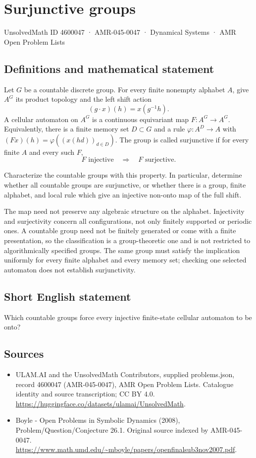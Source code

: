 \documentclass[11pt,a4paper]{article}
\begin{document}
\section*{Surjunctive groups}\label{4600047}
{\small UnsolvedMath ID 4600047 · AMR-045-0047 · Dynamical Systems · AMR Open Problem Lists}
\subsection{Definitions and mathematical statement}
Let $G$ be a countable discrete group. For every finite nonempty
alphabet $A$, give $A^G$ its product topology and the left
shift action
\[
                   (g\cdot x)(h)=x(g^{-1}h).
\]
A cellular automaton on $A^G$ is a continuous equivariant map
$F:A^G\to A^G$. Equivalently, there is a finite memory set
$D\subset G$ and a rule $\varphi:A^D\to A$ with
$(Fx)(h)=\varphi((x(hd))_{d\in D})$.
The group is called surjunctive if for every finite $A$ and
every such $F$,
\[
                       F\text{ injective}\quad\Longrightarrow\quad
                       F\text{ surjective}.
\]

Characterize the countable groups with this property. In
particular, determine whether all countable groups are
surjunctive, or whether there is a group, finite alphabet, and
local rule which give an injective non-onto map of the full
shift.

The map need not preserve any algebraic structure on the
alphabet. Injectivity and surjectivity concern all configurations,
not only finitely supported or periodic ones. A countable group
need not be finitely generated or come with a finite presentation,
so the classification is a group-theoretic one and is not
restricted to algorithmically specified groups. The same group
must satisfy the implication uniformly for every finite alphabet
and every memory set; checking one selected automaton does
not establish surjunctivity.
\subsection{Short English statement}
Which countable groups force every injective finite-state cellular automaton to be onto?
\subsection{Sources}
\begin{itemize}
\item[S1] ULAM.AI and the UnsolvedMath Contributors, supplied problems.json, record 4600047 (AMR-045-0047), AMR Open Problem Lists. Catalogue identity and source transcription; CC BY 4.0.
\url{https://huggingface.co/datasets/ulamai/UnsolvedMath}.
\item[S2] Boyle - Open Problems in Symbolic Dynamics (2008), Problem/Question/Conjecture 26.1. Original source indexed by AMR-045-0047.
\url{https://www.math.umd.edu/~mboyle/papers/openfinalsub3nov2007.pdf}.
\end{itemize}
\end{document}
